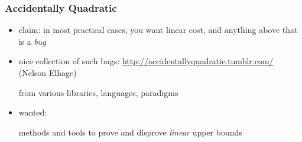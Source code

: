 \begin{frame}[fragile]
\frametitle{Accidentally Quadratic}

\begin{itemize}
\item 
claim: 
in most practical cases, 
you want linear cost,
and anything above that is a \emph{bug}

\item
nice collection of such bugs:
\url{http://accidentallyquadratic.tumblr.com/}
(Nelson Elhage)

from various libraries, languages, paradigms


\item
wanted:

methods and tools to prove and disprove 
\emph{linear} upper bounds


\end{itemize}

\end{frame}
